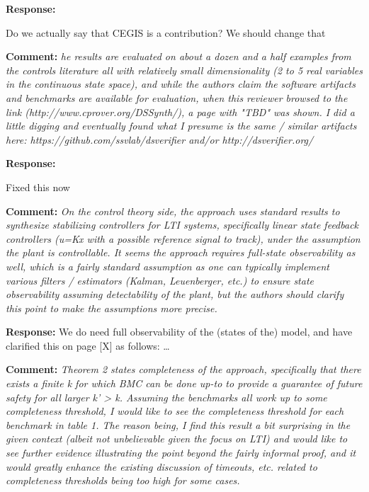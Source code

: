 \documentclass{article}
\begin{document}
{\bf Response: }

Do we actually say that CEGIS is a contribution? We should change that


\vspace{2em}
{\bf Comment: } {\itshape he results are evaluated on about a dozen and a half examples from the controls literature all with relatively small
dimensionality (2 to 5 real variables in the continuous state space), and while the authors claim the software artifacts and benchmarks are available
for evaluation, when this reviewer browsed to the link (http://www.cprover.org/DSSynth/), a page with "TBD" was shown. I did a little digging and
eventually found what I presume is the same / similar artifacts here: https://github.com/ssvlab/dsverifier and/or http://dsverifier.org/}

\vspace{1em}
{\bf Response: }

Fixed this now

\vspace{2em}
{\bf Comment: } {\itshape On the control theory side, the approach uses standard results to synthesize stabilizing controllers for LTI systems,
specifically linear state feedback controllers (u=Kx with a possible reference signal to track), under the assumption the plant is controllable. It
seems the approach requires full-state observability as well, which is a fairly standard assumption as one can typically implement various filters /
estimators (Kalman, Leuenberger, etc.) to ensure state observability assuming detectability of the plant, but the authors should clarify this point to
make the assumptions more precise.}

\vspace{1em}
{\bf Response: }
We do need full observability of the (states of the) model, and have clarified this on page [X] as follows: \ldots 

\vspace{2em}
{\bf Comment: } {\itshape Theorem 2 states completeness of the approach, specifically that there exists a finite k for which BMC can be done up-to to
provide a guarantee of future safety for all larger k' > k. Assuming the benchmarks all work up to some completeness threshold, I would like to see
the completeness threshold for each benchmark in table 1. The reason being, I find this result a bit surprising in the given context (albeit not
unbelievable given the focus on LTI) and would like to see further evidence illustrating the point beyond the fairly informal proof, and it would
greatly enhance the existing discussion of timeouts, etc. related to completeness thresholds being too high for some cases.}
\end{document}
